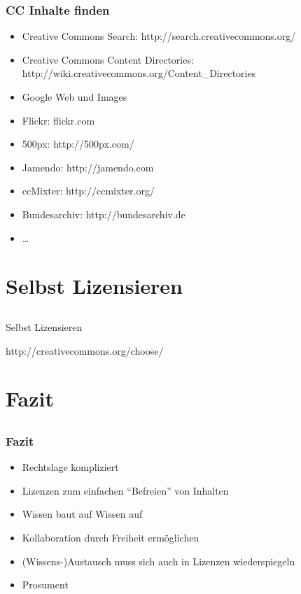 \documentclass[table]{beamer}
\begin{document}
\begin{frame}
    \frametitle{CC Inhalte finden}
    \begin{itemize}
        \item<2-> Creative Commons Search: http://search.creativecommons.org/
        \item<3-> Creative Commons Content Directories: http://wiki.creativecommons.org/Content\_Directories
        \item<4-> Google Web und Images
        \item<5-> Flickr: flickr.com
        \item<6-> 500px: http://500px.com/
        \item<7-> Jamendo: http://jamendo.com
        \item<8-> ccMixter: http://ccmixter.org/
        \item<9-> Bundesarchiv: http://bundesarchiv.de
        \item<10-> \ldots
    \end{itemize}
\end{frame}

\section{Selbst Lizensieren}
\subsection{}

\begin{frame}
    \begin{center}\Large
    Selbst Lizensieren
    \end {center}
\end{frame}

\begin{frame}
    \begin{center}\Large
    http://creativecommons.org/choose/
    \end {center}
\end{frame}

\section{Fazit}
\subsection{}

\begin{frame}
    \frametitle{Fazit}
    \begin{itemize}
      \item<2-> Rechtslage kompliziert
      \item<3-> Lizenzen zum einfachen ``Befreien'' von Inhalten
      \item<4-> Wissen baut auf Wissen auf
      \item<5-> Kollaboration durch Freiheit ermöglichen
      \item<6-> (Wissens-)Austausch muss sich auch in Lizenzen wiederspiegeln
      \item<7-> Prosument
    \end{itemize}
\end{frame}
\end{document}
